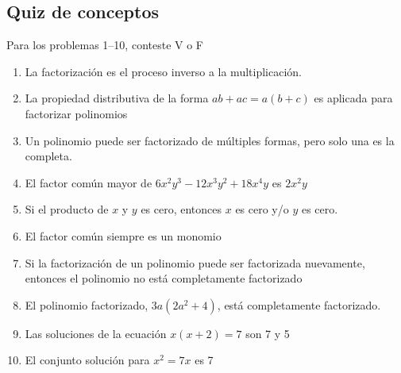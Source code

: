 \documentclass[10pt,twoside]{article}
\begin{document}
\subsection*{Quiz de conceptos}
Para los problemas 1--10, conteste V o F
\begin{enumerate}
\item La factorizaci\'{o}n es el proceso inverso a la multiplicaci\'{o}n.
\item La propiedad distributiva de la forma $ab+ac=a(b+c)$ es aplicada para factorizar polinomios
\item Un polinomio puede ser factorizado de m\'{u}ltiples formas, pero solo una es la completa.
\item El factor común mayor de $6x^{2}y^{3}-12x^{3}y^{2}+18x^{4}y$ es $2x^{2}y$
\item Si el producto de $x$ y $y$ es cero, entonces $x$ es cero y/o $y$ es cero.
\item El factor común siempre es un monomio
\item Si la factorización de un polinomio puede ser factorizada nuevamente, entonces el polinomio no está completamente factorizado
\item El polinomio factorizado, $3a(2a^{2}+4)$, está completamente factorizado.
\item Las soluciones de la ecuación $x(x+2)=7$ son 7 y 5
\item El conjunto solución para $x^{2}=7x$ es 7
\end{enumerate}
\end{document}
